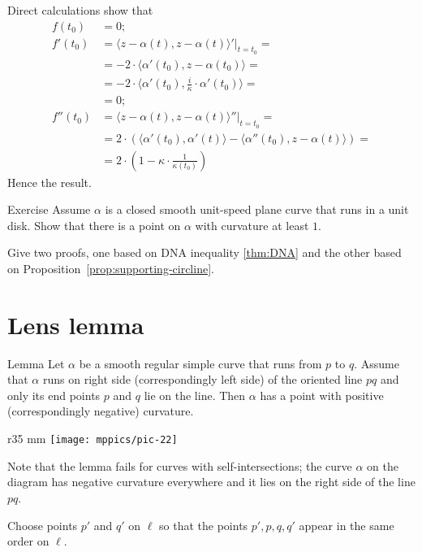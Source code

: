 Direct calculations show that
\begin{align*}
f(t_0)&=0;
\\
f'(t_0)&=\left.\langle z-\alpha(t),z-\alpha(t) \rangle'\right|_{t=t_0}=
\\
&=-2\cdot \langle \alpha'(t_0),z-\alpha(t_0) \rangle=
\\&=-2\cdot \langle \alpha'(t_0),\tfrac i\kappa \cdot\alpha'(t_0) \rangle=
\\
&=0;
\\
f''(t_0)&=\langle z-\alpha(t),z-\alpha(t) \rangle''|_{t=t_0}=
\\
&=2\cdot\left( \langle \alpha'(t_0),\alpha'(t) \rangle-\langle \alpha''(t_0),z-\alpha(t) \rangle \right)=
\\
&=2\cdot\left(1-\kappa\cdot \frac1{\kappa(t_0)}\right)
\end{align*}
Hence the result.\qeds


\begin{thm}{Exercise}
Assume $\alpha$ is a closed smooth unit-speed plane curve that runs in a unit disk.
Show that there is a point on $\alpha$ with curvature at least $1$.

Give two proofs, one based on DNA inequality \ref{thm:DNA} and the other based on Proposition~\ref{prop:supporting-circline}.
\end{thm}

\section{Lens lemma}

\begin{thm}{Lemma}\label{lem:lens}
Let $\alpha$ be a smooth regular simple curve that runs from $p$ to $q$.
Assume that $\alpha$ runs on right side (correspondingly left side) of the oriented line $pq$ and only its end points $p$ and $q$ lie on the line.
Then $\alpha$ has a point with positive  (correspondingly negative) curvature.
\end{thm}

\begin{wrapfigure}{r}{35 mm}
\vskip-4mm
\centering
\texttt{[image: mppics/pic-22]}
\vskip0mm
\end{wrapfigure}

Note that the lemma fails for curves with self-intersections;
the curve $\alpha$ on the diagram has negative curvature everywhere and it lies on the right side of the line $pq$. 

Choose points $p'$ and $q'$ on $\ell$
so that the points $p', p, q, q'$ appear in the same order on $\ell$.

